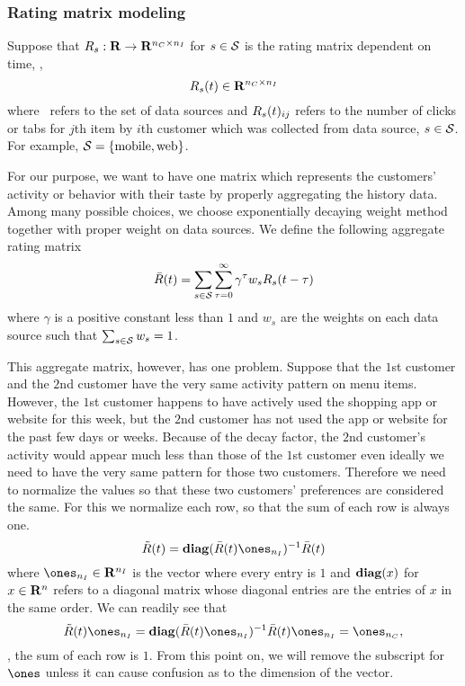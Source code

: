 \subsubsection{Rating matrix modeling}

Suppose that $R_s: \mathbf{R} \to \mathbf{R}^{{n_C} \times {n_I}}$ for $s\in\mathcal{S}$ is the rating matrix dependent on time,
\ie,
\begin{equation}
\label{eq:rating-matrix-temporal}
R_s(t)  \in \mathbf{R}^{{n_C} \times {n_I}}
\end{equation}
where
\datsourceset\ refers to the set of data sources
and $R_s(t)_{ij}$ refers to the number of clicks or tabs for $j$th item by $i$th customer
which was collected from data source, $s \in \mathcal{S}$.
For example, $\mathcal{S} = \{\mathrm{mobile}, \mathrm{web}\}$.

For our purpose, we want to have one matrix which represents the customers' activity or behavior with their taste
by properly aggregating the history data.
Among many possible choices, we choose exponentially decaying weight method together with proper weight on data sources.
We define the following aggregate rating matrix
\begin{equation}
\label{eq:ratmat-aggr}
\bar{R}(t) = \sum_{s\in\mathcal{S}} \sum_{\tau=0}^\infty \gamma^\tau w_s R_s(t-\tau)
\end{equation}
where $\gamma$ is a positive constant less than $1$ and $w_s$ are the weights on each data source such that
$\sum_{s\in\mathcal{S}} w_s = 1$.


This aggregate matrix, however, has one problem.
Suppose that the $1$st customer and the $2$nd customer have the very same activity pattern on menu items.
However, the $1$st customer happens to have actively used the shopping app or website for this week,
but the $2$nd customer has not used the app or website for the past few days or weeks.
Because of the decay factor, the $2$nd customer's activity would appear much less than those of the $1$st customer
even ideally we need to have the very same pattern for those two customers.
Therefore we need to normalize the values so that these two customers' preferences are considered the same.
For this we normalize each row, so that the sum of each row is always one.
\begin{equation}
\label{eq:ratmat-norm}
\ratmatnorm(t) = \diag(\ratmataggr(t) \ones_{\numitem})^{-1}\ratmataggr(t)
\end{equation}
where $\ones_{\numitem}\in\reals^{\numitem}$ is the vector where every entry is $1$
and $\mathbf{diag}(x)$ for $x\in\mathbf{R}^n$ refers to a diagonal matrix whose diagonal entries are the entries of $x$ in the same order.
We can readily see that
\begin{equation}
\ratmatnorm(t) \ones_{\numitem} = \diag(\ratmataggr(t) \ones_{\numitem})^{-1}\ratmataggr(t) \ones_{\numitem} = \ones_{\numcus},
\end{equation}
\ie, the sum of each row is $1$.
From this point on, we will remove the subscript for $\ones$ unless it can cause confusion as to the dimension of the vector.

